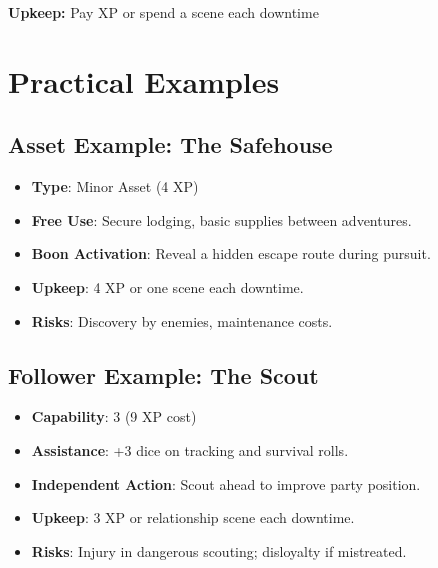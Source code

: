 \begin{multicols}{2}
\begin{tcolorbox}[colback=blue!5!white,colframe=blue!75!black,title=Assets and Followers Quick Reference,fonttitle=\bfseries]
\textbf{Upkeep:} Pay XP or spend a scene each downtime
\end{tcolorbox}

\section{Practical Examples}

\subsection*{Asset Example: The Safehouse}
\begin{itemize}
\item \textbf{Type}: Minor Asset (4 XP)
\item \textbf{Free Use}: Secure lodging, basic supplies between adventures.
\item \textbf{Boon Activation}: Reveal a hidden escape route during pursuit.
\item \textbf{Upkeep}: 4 XP or one scene each downtime.
\item \textbf{Risks}: Discovery by enemies, maintenance costs.
\end{itemize}

\subsection*{Follower Example: The Scout}
\begin{itemize}
\item \textbf{Capability}: 3 (9 XP cost)
\item \textbf{Assistance}: +3 dice on tracking and survival rolls.
\item \textbf{Independent Action}: Scout ahead to improve party position.
\item \textbf{Upkeep}: 3 XP or relationship scene each downtime.
\item \textbf{Risks}: Injury in dangerous scouting; disloyalty if mistreated.
\end{itemize}


\end{multicols}
